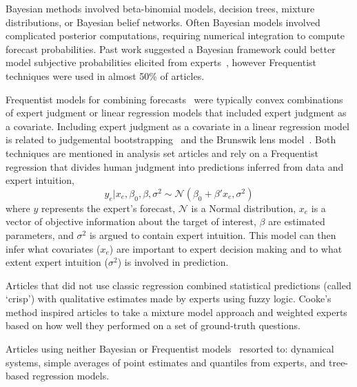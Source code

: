 \documentclass[preprint]{elsarticle}
\begin{document}
Bayesian methods involved beta-binomial models, decision trees, mixture distributions, or Bayesian belief networks.
Often Bayesian models involved complicated posterior computations, requiring numerical integration to compute forecast probabilities.
Past work suggested a Bayesian framework could better model subjective probabilities elicited from experts~\cite{clemen2007advances}, however Frequentist techniques were used in almost 50\% of articles. 

Frequentist models for combining forecasts~\cite{cooke2014out,klas2010support,mak1996aggregating,hurley2002combining,morales2017characterization,borsuk2004predictive,hanea2018value,cabello2012combination,adams2009acceptability,alho1992estimating,evans1994use,jana2019interval,hora2015calibration,hathout2016uncertainty,wang2008probabilistic,ren2002optimal,kurowicka2010probabilistic,baldwin2015weighting,baecke2017investigating,seifert2013relative,gu2016expert,mu1999multi,graefe2014combining,alvarado2017expertise,shin2013robust,franses2011averaging} were typically convex combinations of expert judgment or linear regression models that included expert judgment as a covariate.
Including expert judgment as a covariate in a linear regression model is related to judgemental bootstrapping~\cite{armstrong2001judgmental} and the Brunswik lens model~\cite{hammond2001essential}. 
Both techniques are mentioned in analysis set articles and rely on a Frequentist regression that divides human judgment into predictions inferred from data and expert intuition,
\begin{equation*}
  y_{e} | x_{e}, \beta_{0}, \beta, \sigma^{2}  \sim \mathcal{N}( \beta_{0} + \beta'x_{e} ,\sigma^{2})
\end{equation*}
where $y$ represents the expert's forecast, $\mathcal{N}$ is a Normal distribution, $x_{e}$ is a vector of objective information about the target of interest, $\beta$ are estimated parameters, and $\sigma^{2}$ is argued to contain expert intuition.
This model can then infer what covariates ($x_{e}$) are important to expert decision making and to what extent expert intuition ($\sigma^{2}$) is involved in prediction.

Articles that did not use classic regression combined statistical predictions (called `crisp') with qualitative estimates made by experts using fuzzy logic.
Cooke's method inspired articles to take a mixture model approach and weighted experts based on how well they performed on a set of ground-truth questions.

Articles using neither Bayesian or Frequentist models~\cite{johnson2018making,li2012preliminary,petrovic2006fuzzy,song2013combining,graefe2014accuracy,morgan2014use,cai2016simple,kabak2008aggregating,graefe2015accuracy,graefe2018predicting,failing2004using,ren2002optimal,hora2013median,baron2014two} resorted to: dynamical systems, simple averages of point estimates and quantiles from experts, and tree-based regression models.
\end{document}
